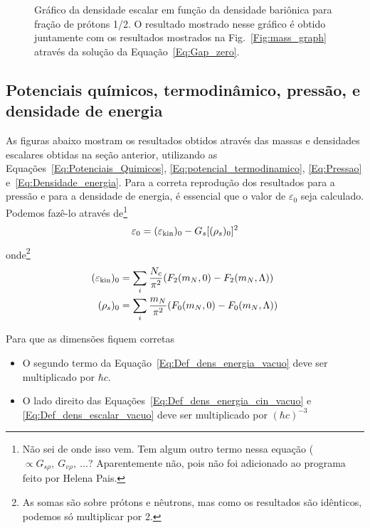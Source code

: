 \begin{figure}
	
	\caption{Gráfico da densidade escalar em função da densidade bariônica para fração de prótons 1/2. O resultado mostrado nesse gráfico é obtido juntamente com os resultados mostrados na Fig.~\ref{Fig:mass_graph} através da solução da Equação~\ref{Eq:Gap_zero}. \protect}
	\label{Fig:scalar_density_graph}
\end{figure}

\FloatBarrier
\subsection{Potenciais químicos, termodinâmico, pressão, e densidade de energia}

As figuras abaixo mostram os resultados obtidos através das massas e densidades escalares obtidas na seção anterior, utilizando as Equações~\eqref{Eq:Potenciais_Quimicos}, \eqref{Eq:potencial_termodinamico}, \eqref{Eq:Pressao} e~\eqref{Eq:Densidade_energia}. Para a correta reprodução dos resultados para a pressão e para a densidade de energia, é essencial que o valor de $\varepsilon_0$ seja calculado. Podemos fazê-lo através de\footnote{Não sei de onde isso vem. Tem algum outro termo nessa equação ($\propto G_{s\rho},~G_{v\rho},~\dots$? Aparentemente não, pois não foi adicionado ao programa feito por Helena Pais.}
\begin{equation}\label{Eq:Def_dens_energia_vacuo}
	\varepsilon_0 = (\varepsilon_{\rm{kin}})_0 - G_s [(\rho_s)_0]^2
\end{equation}
%
onde\footnote{As somas são sobre prótons e nêutrons, mas como os resultados são idênticos, podemos só multiplicar por 2.}
\begin{align}
	(\varepsilon_{\rm{kin}})_0 &= \sum_i \frac{N_c}{\pi^2} (F_2(m_N,0) - F_2(m_N, \Lambda)) \label{Eq:Def_dens_energia_cin_vacuo}\\
	(\rho_s)_0 &= \sum_i \frac{m_N}{\pi^2} (F_0(m_N, 0) - F_0(m_N, \Lambda)) \label{Eq:Def_dens_escalar_vacuo}
\end{align}

Para que as dimensões fiquem corretas
\begin{itemize}
	\item O segundo termo da Equação~\eqref{Eq:Def_dens_energia_vacuo} deve ser multiplicado por $\hbar c$.
	\item O lado direito das Equações~\eqref{Eq:Def_dens_energia_cin_vacuo} e \eqref{Eq:Def_dens_escalar_vacuo} deve ser multiplicado por $(\hbar c)^{-3}$
\end{itemize}


